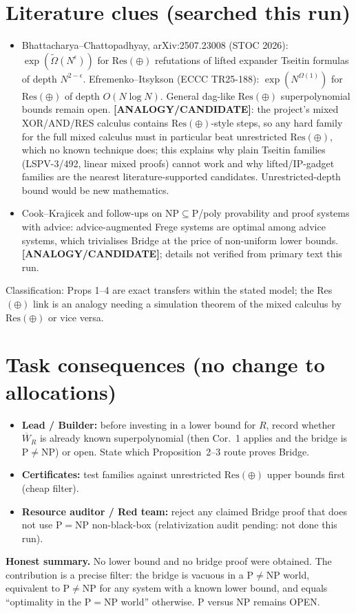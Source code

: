 \documentclass[11pt]{article}
\theoremstyle{remark}
\newcommand{\status}[1]{\textbf{[#1]}}
\newcommand{\Wb}{\overline W}
\begin{document}
\section{Literature clues (searched this run)}
\begin{itemize}
\item Bhattacharya--Chattopadhyay, arXiv:2507.23008 (STOC 2026): $\exp(\tilde\Omega(N^\epsilon))$ for $\mathrm{Res}(\oplus)$ refutations of lifted expander Tseitin formulas of depth $N^{2-\epsilon}$. Efremenko--Itsykson (ECCC TR25-188): $\exp(N^{\Omega(1)})$ for $\mathrm{Res}(\oplus)$ of depth $O(N\log N)$. General dag-like $\mathrm{Res}(\oplus)$ superpolynomial bounds remain open. \status{ANALOGY/CANDIDATE}: the project's mixed XOR/AND/RES calculus contains $\mathrm{Res}(\oplus)$-style steps, so any hard family for the full mixed calculus must in particular beat unrestricted $\mathrm{Res}(\oplus)$, which no known technique does; this explains why plain Tseitin families (LSPV-3/492, linear mixed proofs) cannot work and why lifted/IP-gadget families are the nearest literature-supported candidates. Unrestricted-depth bound would be new mathematics.
\item Cook--Krajicek and follow-ups on NP$\subseteq$P/poly provability and proof systems with advice: advice-augmented Frege systems are optimal among advice systems, which trivialises Bridge at the price of non-uniform lower bounds. \status{ANALOGY/CANDIDATE}; details not verified from primary text this run.
\end{itemize}
Classification: Props 1--4 are exact transfers within the stated model; the Res$(\oplus)$ link is an analogy needing a simulation theorem of the mixed calculus by $\mathrm{Res}(\oplus)$ or vice versa.

\section{Task consequences (no change to allocations)}
\begin{itemize}
\item \textbf{Lead / Builder:} before investing in a lower bound for $R$, record whether $\Wb_R$ is already known superpolynomial (then Cor.~1 applies and the bridge is P$\ne$NP) or open. State which Proposition~2--3 route proves Bridge.
\item \textbf{Certificates:} test families against unrestricted $\mathrm{Res}(\oplus)$ upper bounds first (cheap filter).
\item \textbf{Resource auditor / Red team:} reject any claimed Bridge proof that does not use $\mathrm P=\mathrm{NP}$ non-black-box (relativization audit pending: not done this run).
\end{itemize}
\noindent\textbf{Honest summary.} No lower bound and no bridge proof were obtained. The contribution is a precise filter: the bridge is vacuous in a P$\neq$NP world, equivalent to P$\neq$NP for any system with a known lower bound, and equals ``optimality in the P$=$NP world'' otherwise. P versus NP remains OPEN.

\end{document}
